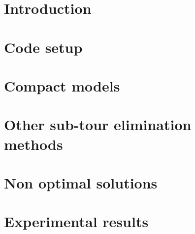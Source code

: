 
\thispagestyle{empty}

%

\tableofcontents %

\clearpage{\pagestyle{plain}\cleardoublepage} %


\chapter{Introduction} %
\label{chapter:primo_capitolo} %

\chapter{Code setup}
\label{chapter:code-setup}


\chapter{Compact models} 
\label{chapter:compact-models} 
 

\clearpage{\pagestyle{plain}\cleardoublepage}
\chapter{Other sub-tour elimination methods} 
\label{chapter:other-sec} 
 

\clearpage{\pagestyle{plain}\cleardoublepage}
\chapter{Non optimal solutions} 
\label{chapter:codice} 


\chapter{Experimental results}
\label{chapter:results}


\clearpage{\pagestyle{plain}\cleardoublepage}


